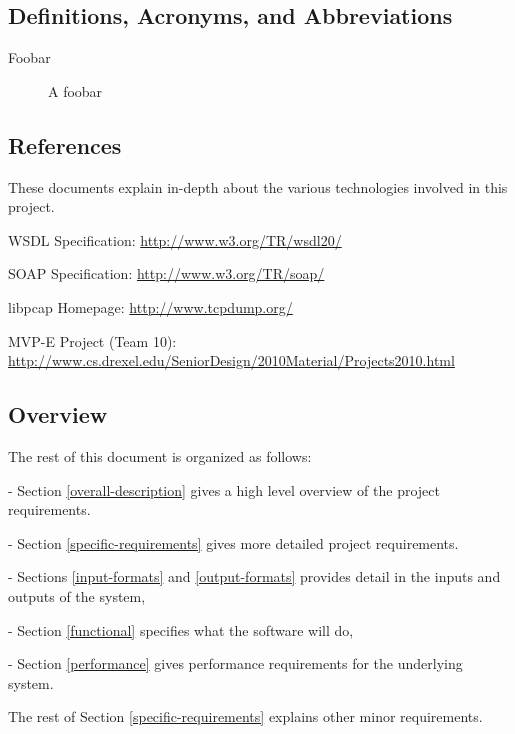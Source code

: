 \documentclass[titlepage]{article}
\begin{document}

\subsection{Definitions, Acronyms, and Abbreviations%
  \label{definitions}%
}

\begin{description}
\item[Foobar]
    A foobar

\end{description}


\subsection{References%
  \label{references}%
}

These documents explain in-depth about the various technologies involved in this project.
%
\begin{itemize*}
	\item WSDL Specification: \url{http://www.w3.org/TR/wsdl20/}
	\item SOAP Specification: \url{http://www.w3.org/TR/soap/}
	\item libpcap Homepage: \url{http://www.tcpdump.org/}
	\item MVP-E Project (Team 10): \url{http://www.cs.drexel.edu/SeniorDesign/2010Material/Projects2010.html}
\end{itemize*}


\subsection{Overview%
  \label{overview}%
}

The rest of this document is organized as follows: 
\begin{itemize*}
	\item[-]Section \ref{overall-description} gives a high level overview of the project requirements.  
	\item[-]Section \ref{specific-requirements} gives more detailed project requirements.  
	\item[-]Sections \ref{input-formats} and \ref{output-formats} provides detail in the inputs and outputs of the system, 
	\item[-]Section \ref{functional} specifies what the software will do, 
	\item[-]Section \ref{performance} gives performance requirements for the underlying system.
\end{itemize*}
The rest of Section \ref{specific-requirements} explains other minor requirements.
\end{document}
